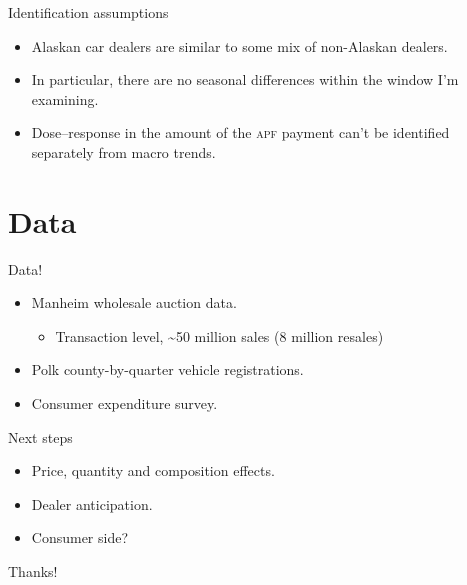 \documentclass[aspectratio=169]{beamer}
\begin{document}
\begin{frame}{Identification assumptions}
	\begin{itemize}
		\item Alaskan car dealers are similar to some mix of non-Alaskan dealers.
		\item In particular, there are no seasonal differences within the window I'm examining.
		\item Dose--response in the amount of the \textsc{apf} payment can't be identified separately from macro trends.
	\end{itemize}
\end{frame}

\section{Data}
\begin{frame}{Data!}
	\begin{itemize}
		\item Manheim wholesale auction data.
		\begin{itemize}
			\item Transaction level, \textasciitilde 50 million sales (8 million resales)
		\end{itemize}
		\item Polk county-by-quarter vehicle registrations.
		\item Consumer expenditure survey.
	\end{itemize}
\end{frame}

\begin{frame}{Next steps}
	\begin{itemize}
		\item Price, quantity and composition effects.
		\item Dealer anticipation.
		\item Consumer side?
	\end{itemize}
\end{frame}
\begin{frame}
	\begin{center}

	\LARGE Thanks!
	\end{center}
\end{frame}
\end{document}
